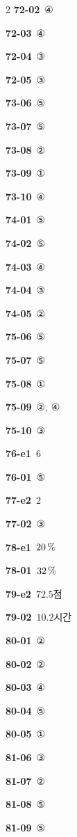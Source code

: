 \documentclass[10pt,a4paper]{article}
\begin{document}
\begin{multicols}{2}
\noindent\textbf{72-02}\ ④\par
\noindent\textbf{72-03}\ ④\par
\noindent\textbf{72-04}\ ③\par
\noindent\textbf{72-05}\ ③\par
\noindent\textbf{73-06}\ ⑤\par
\noindent\textbf{73-07}\ ⑤\par
\noindent\textbf{73-08}\ ②\par
\noindent\textbf{73-09}\ ①\par
\noindent\textbf{73-10}\ ④\par
\noindent\textbf{74-01}\ ⑤\par
\noindent\textbf{74-02}\ ⑤\par
\noindent\textbf{74-03}\ ④\par
\noindent\textbf{74-04}\ ③\par
\noindent\textbf{74-05}\ ②\par
\noindent\textbf{75-06}\ ⑤\par
\noindent\textbf{75-07}\ ⑤\par
\noindent\textbf{75-08}\ ①\par
\noindent\textbf{75-09}\ ②, ④\par
\noindent\textbf{75-10}\ ③\par
\noindent\textbf{76-e1}\ $6$\par
\noindent\textbf{76-01}\ ⑤\par
\noindent\textbf{77-e2}\ $2$\par
\noindent\textbf{77-02}\ ③\par
\noindent\textbf{78-e1}\ $20\mkern3mu \%$\par
\noindent\textbf{78-01}\ $32\mkern3mu \%$\par
\noindent\textbf{79-e2}\ $72.5$점\par
\noindent\textbf{79-02}\ $10.2$시간\par
\noindent\textbf{80-01}\ ②\par
\noindent\textbf{80-02}\ ②\par
\noindent\textbf{80-03}\ ④\par
\noindent\textbf{80-04}\ ⑤\par
\noindent\textbf{80-05}\ ①\par
\noindent\textbf{81-06}\ ③\par
\noindent\textbf{81-07}\ ②\par
\noindent\textbf{81-08}\ ⑤\par
\noindent\textbf{81-09}\ ⑤\par

\end{multicols}
\end{document}
